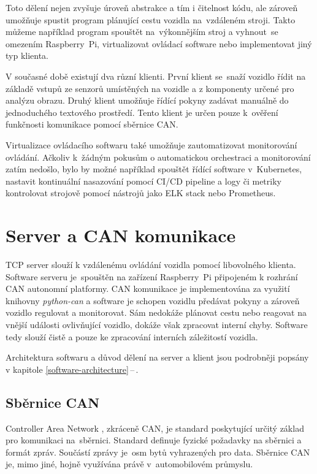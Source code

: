 \documentclass[czech, bachelor]{diploma}
\newcommand{\peteref}[1]{\ref{#1}\,--\,\nameref{#1}}
\begin{document}
Toto dělení nejen zvyšuje úroveň abstrakce a tím i čitelnost kódu, ale zároveň umožňuje spustit program plánující cestu vozidla
na~vzdáleném stroji. Takto můžeme například program spouštět na~výkonnějším stroj a vyhnout~se omezením Raspberry~Pi,
virtualizovat ovládací software nebo implementovat jiný typ klienta.

V současné době existují dva různí klienti. První klient se~snaží vozidlo řídit na základě vstupů ze senzorů umístěných na vozidle
a z komponenty určené pro analýzu obrazu. Druhý klient umožňuje řídící pokyny zadávat manuálně do jednoduchého textového
prostředí. Tento klient je určen pouze k~ověření funkčnosti komunikace pomocí sběrnice CAN.

Virtualizace ovládacího softwaru také umožňuje zautomatizovat monitorování ovládání. Ačkoliv k~žádným pokusům o automatickou
orchestraci a monitorování zatím nedošlo, bylo by možné například spouštět řídící software v~Kubernetes, nastavit kontinuální
nasazování pomocí CI/CD pipeline a logy či metriky kontrolovat strojově pomocí nástrojů jako ELK stack nebo Prometheus.

\chapter{Server a CAN komunikace}

TCP server slouží k vzdálenému ovládání vozidla pomocí libovolného klienta. Software serveru je~spouštěn na zařízení Raspberry~Pi
připojeném k rozhrání CAN autonomní platformy. CAN komunikace je implementována za využití knihovny \emph{python-can} a software
je schopen vozidlu předávat pokyny a zároveň vozidlo regulovat a monitorovat. Sám nedokáže plánovat cestu nebo reagovat
na vnější události ovlivňující vozidlo, dokáže však zpracovat interní chyby. Software tedy slouží čistě a pouze ke zpracování
interních záležitostí vozidla.

Architektura softwaru a důvod dělení na server a klient jsou podrobněji popsány v kapitole \peteref{software-architecture}.

\section{Sběrnice CAN}

Controller Area Network \cite{can-source}, zkráceně CAN, je standard poskytující určitý základ pro komunikaci na~sběrnici.
Standard definuje fyzické požadavky na sběrnici a formát zpráv. Součástí zprávy je~osm bytů vyhrazených pro data. Sběrnice CAN je,
mimo jiné, hojně využívána právě v~automobilovém průmyslu.
\end{document}

